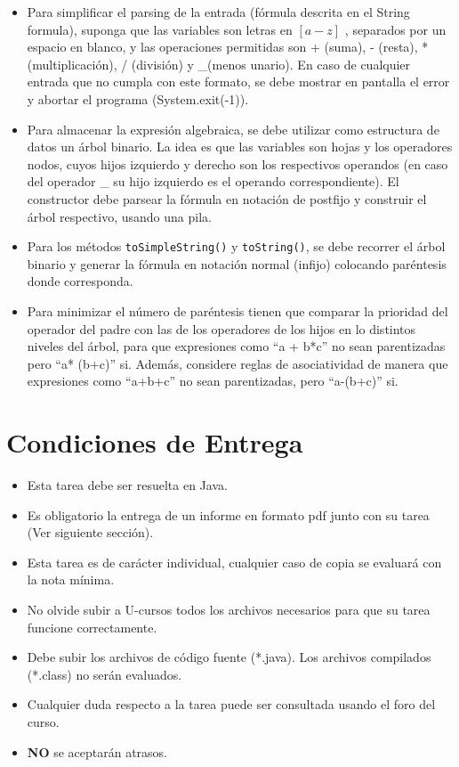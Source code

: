\documentclass[dcc]{fcfmcourse}
\begin{document}
\begin{itemize}
\item Para simplificar el parsing de la entrada (fórmula descrita en el String formula), suponga que las variables son letras en $\left[a-z\right]$ , separados por un espacio en blanco, y las operaciones permitidas son + (suma), - (resta), * (multiplicación), / (división) y \_(menos unario). En caso de cualquier entrada que no cumpla con este formato, se debe mostrar en pantalla el error y abortar el programa (System.exit(-1)).
\item Para almacenar la expresión algebraica, se debe utilizar como estructura de datos un árbol binario. La idea es que las variables son hojas y los operadores nodos, cuyos hijos izquierdo y derecho son los respectivos operandos (en caso del operador \_ su hijo izquierdo es el operando correspondiente). El constructor debe parsear la fórmula en notación de postfijo y construir el  árbol respectivo, usando una pila.
\item Para los métodos \texttt{toSimpleString()} y \texttt{toString()}, se debe recorrer el  árbol binario y generar la fórmula en notación normal (infijo) colocando paréntesis donde corresponda.
\item Para minimizar el número de paréntesis tienen que comparar la prioridad del operador del padre
con las de los operadores de los hijos en lo distintos niveles del árbol, para que expresiones como ``a + b*c'' no sean parentizadas pero ``a* (b+c)'' si. Además, considere reglas de asociatividad de manera que expresiones como ``a+b+c'' no sean parentizadas, pero ``a-(b+c)'' si.
\end{itemize}
\newpage
\section{Condiciones de Entrega}

\begin{itemize}
    \item Esta tarea debe ser resuelta en Java.
    \item Es obligatorio la entrega de un informe en formato pdf junto con su tarea (Ver siguiente sección).
    \item Esta tarea es de carácter individual, cualquier caso de copia se evaluará con la nota mínima.
    \item No olvide subir a U-cursos todos los archivos necesarios para que su tarea funcione correctamente.
    \item Debe subir los archivos de código fuente (*.java). Los archivos compilados (*.class) no serán evaluados.
    \item Cualquier duda respecto a la tarea puede ser consultada usando el foro del curso.
    \item \textbf{NO} se aceptarán atrasos.
\end{itemize}
\end{document}
